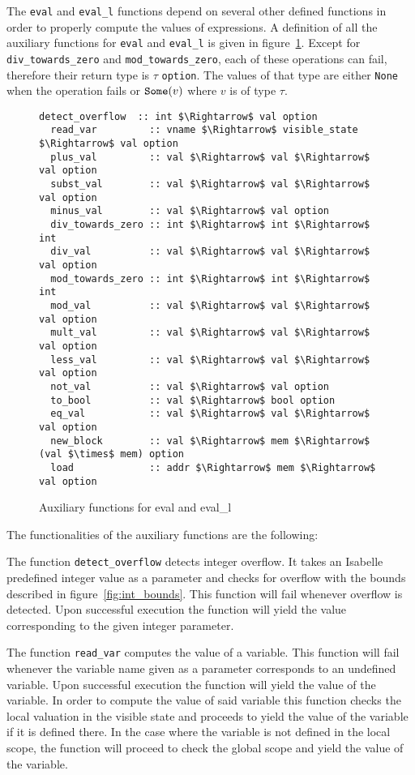The \verb|eval| and \verb|eval_l| functions depend on several other defined functions in order to properly compute the values of expressions.
A definition of all the auxiliary functions for \verb|eval| and \verb|eval_l| is given in figure~\ref{fig:aux_fun_eval}.
Except for \verb|div_towards_zero| and \verb|mod_towards_zero|, each of these operations can fail, therefore their return type is $\tau$ \verb|option|.
The values of that type are either \verb|None| when the operation fails or $\verb|Some|(v)$ where $v$ is of type $\tau$.

\begin{figure}
  \begin{lstlisting}[mathescape=true, frame=single]
  detect_overflow  :: int $\Rightarrow$ val option
  read_var         :: vname $\Rightarrow$ visible_state $\Rightarrow$ val option
  plus_val         :: val $\Rightarrow$ val $\Rightarrow$ val option
  subst_val        :: val $\Rightarrow$ val $\Rightarrow$ val option
  minus_val        :: val $\Rightarrow$ val option
  div_towards_zero :: int $\Rightarrow$ int $\Rightarrow$ int
  div_val          :: val $\Rightarrow$ val $\Rightarrow$ val option
  mod_towards_zero :: int $\Rightarrow$ int $\Rightarrow$ int
  mod_val          :: val $\Rightarrow$ val $\Rightarrow$ val option
  mult_val         :: val $\Rightarrow$ val $\Rightarrow$ val option
  less_val         :: val $\Rightarrow$ val $\Rightarrow$ val option
  not_val          :: val $\Rightarrow$ val option
  to_bool          :: val $\Rightarrow$ bool option
  eq_val           :: val $\Rightarrow$ val $\Rightarrow$ val option
  new_block        :: val $\Rightarrow$ mem $\Rightarrow$ (val $\times$ mem) option
  load             :: addr $\Rightarrow$ mem $\Rightarrow$ val option
  \end{lstlisting}

  \caption{Auxiliary functions for eval and eval\_l}
  \label{fig:aux_fun_eval}
\end{figure}

The functionalities of the auxiliary functions are the following:

The function \verb|detect_overflow| detects integer overflow.
It takes an Isabelle predefined integer value as a parameter and checks for overflow with the bounds described in figure~\ref{fig:int_bounds}.
This function will fail whenever overflow is detected.
Upon successful execution the function will yield the value corresponding to the given integer parameter.

The function \verb|read_var| computes the value of a variable.
This function will fail whenever the variable name given as a parameter corresponds to an undefined variable.
Upon successful execution the function will yield the value of the variable.
In order to compute the value of said variable this function checks the local valuation in the visible state and proceeds to yield the value of the variable if it is defined there.
In the case where the variable is not defined in the local scope, the function will proceed to check the global scope and yield the value of the variable.

